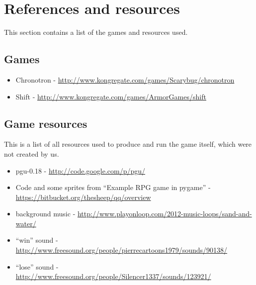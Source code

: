 \section{References and resources}
This section contains a list of the games and resources used.

\subsection{Games}

\begin{itemize}
\item Chronotron - \url{http://www.kongregate.com/games/Scarybug/chronotron}
\item Shift - \url{http://www.kongregate.com/games/ArmorGames/shift}
\end{itemize}

\subsection{Game resources}
This is a list of all resources used to produce and run the game
itself, which were not created by us.

\begin{itemize}
\item pgu-0.18 - \url{http://code.google.com/p/pgu/}
\item Code and some sprites from ``Example RPG game in pygame'' - \url{https://bitbucket.org/thesheep/qq/overview}
\item background music - \url{http://www.playonloop.com/2012-music-loops/sand-and-water/}
\item ``win'' sound - \url{http://www.freesound.org/people/pierrecartoons1979/sounds/90138/}
\item ``lose'' sound - \url{http://www.freesound.org/people/Silencer1337/sounds/123921/}
\end{itemize}



